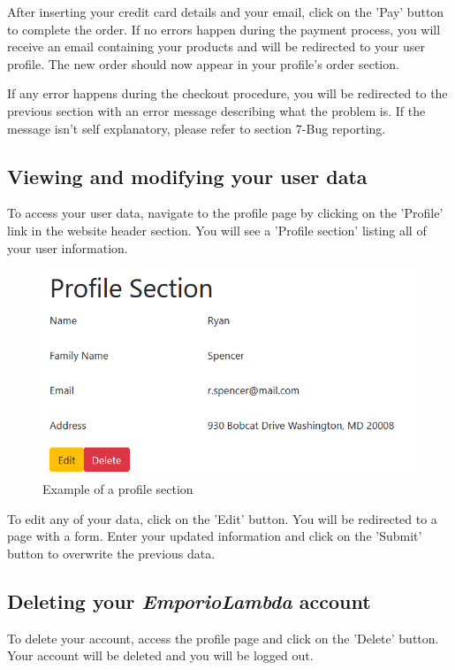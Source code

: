After inserting your credit card details and your email, click on the 'Pay' button to complete the order. If no errors happen during the payment process, you will receive an email containing your products and will be redirected to your user profile. The new order should now appear in your profile's order section. 

If any error happens during the checkout procedure, you will be redirected to the previous section with an error message describing what the problem is. If the message isn't self explanatory, please refer to section 7-Bug reporting.

\subsection{Viewing and modifying your user data}
To access your user data, navigate to the profile page by clicking on the 'Profile' link in the website header section. You will see a 'Profile section' listing all of your user information.

\begin{figure}[H]
\centering
\includegraphics[scale=0.6]{res/Immagini/ProfilePage}
\caption{Example of a profile section}
\end{figure}

To edit any of your data, click on the 'Edit' button. You will be redirected to a page with a form. Enter your updated information and click on the 'Submit' button to overwrite the previous data.

\subsection{Deleting your \textit{EmporioLambda} account}
To delete your account, access the profile page and click on the 'Delete' button. Your account will be deleted and you will be logged out.

